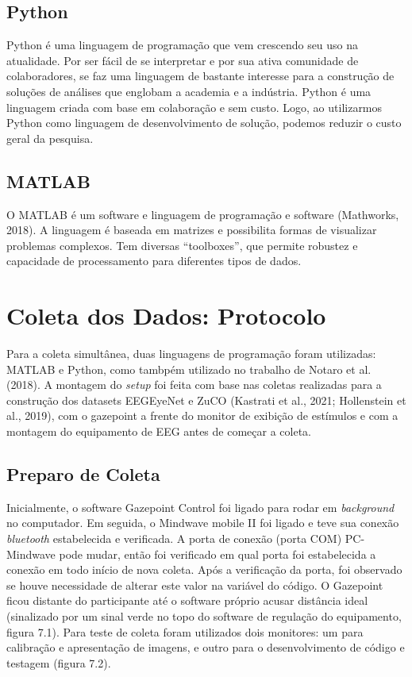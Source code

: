 \subsection{Python}
Python é uma linguagem de programação que vem crescendo seu uso na
atualidade. Por ser fácil de se interpretar e por sua ativa comunidade de
colaboradores, se faz uma linguagem de bastante interesse para a construção de
soluções de análises que englobam a academia e a indústria. Python é uma linguagem
criada com base em colaboração e sem custo. Logo, ao utilizarmos Python como
linguagem de desenvolvimento de solução, podemos reduzir o custo geral da
pesquisa.

\subsection{MATLAB}
O MATLAB é um software e linguagem de programação e software (Mathworks, 2018). A linguagem é baseada em matrizes e possibilita formas de visualizar
problemas complexos. Tem diversas “toolboxes”, que permite robustez e capacidade
de processamento para diferentes tipos de dados.

\section{Coleta dos Dados: Protocolo}

Para a coleta simultânea, duas linguagens de programação foram utilizadas: MATLAB e Python, como tambpém 
utilizado no trabalho de Notaro et al. (2018).  
A montagem do \textit{setup} foi feita com base nas coletas realizadas para a construção dos datasets EEGEyeNet e 
ZuCO (Kastrati et al., 2021; Hollenstein et al., 2019), com o gazepoint a frente do monitor de exibição de estímulos
e com a montagem do equipamento de EEG antes de começar a coleta. 

\subsection{Preparo de Coleta}
Inicialmente, o software Gazepoint Control foi ligado para rodar em  \textit{background} no computador. 
Em seguida, o Mindwave mobile II foi ligado e teve sua conexão \textit{bluetooth} estabelecida e 
verificada. A porta de conexão (porta COM) PC-Mindwave pode mudar, 
então foi verificado em qual porta foi estabelecida a conexão 
em todo início de nova coleta. Após a verificação da porta, foi 
observado se houve necessidade de alterar
este valor na variável do código. O Gazepoint ficou distante do participante até o
software próprio acusar distância ideal (sinalizado por um sinal verde no topo do 
software de regulação do equipamento, figura 7.1).
Para teste de coleta foram utilizados dois monitores: um para calibração e apresentação de imagens,
e outro para o desenvolvimento de código e testagem (figura 7.2). 

